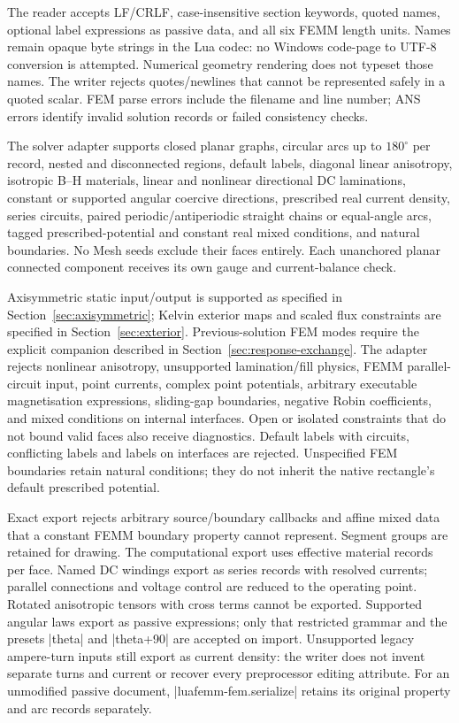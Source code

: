 The reader accepts LF/CRLF, case-insensitive section keywords, quoted names,
optional label expressions as passive data, and all six FEMM length units.
Names remain opaque byte strings in the Lua codec: no Windows code-page to UTF-8
conversion is attempted. Numerical geometry rendering does not typeset those
names. The writer rejects quotes/newlines that cannot be represented safely in a
quoted scalar. FEM parse errors include the filename and line number; ANS
errors identify invalid solution records or failed consistency checks.

The solver adapter supports closed planar graphs, circular arcs up to $180^\circ$
per record, nested and disconnected regions, default labels, diagonal linear
anisotropy, isotropic B--H materials, linear and nonlinear directional DC laminations, constant
or supported angular coercive directions, prescribed real current density,
series circuits, paired periodic/antiperiodic straight chains or equal-angle arcs,
tagged prescribed-potential and constant real mixed conditions, and natural
boundaries. No Mesh seeds exclude their faces entirely. Each
unanchored planar connected component receives its own gauge and current-balance check.

Axisymmetric static input/output is supported as specified in
Section~\ref{sec:axisymmetric}; Kelvin exterior maps and scaled flux constraints
are specified in Section~\ref{sec:exterior}. Previous-solution FEM modes require the explicit companion described in
Section~\ref{sec:response-exchange}. The adapter rejects nonlinear
anisotropy, unsupported lamination/fill physics, FEMM parallel-circuit input,
point currents, complex point potentials, arbitrary executable magnetisation
expressions, sliding-gap boundaries, negative
Robin coefficients, and mixed conditions on internal interfaces. Open or isolated
constraints that do not bound valid faces also receive diagnostics. Default labels
with circuits, conflicting labels and labels on interfaces are rejected.
Unspecified FEM boundaries retain natural conditions; they do not inherit the
native rectangle's default prescribed potential.

Exact export rejects arbitrary source/boundary callbacks and affine mixed data
that a constant FEMM boundary property cannot represent. Segment groups are
retained for drawing. The computational export uses effective material records
per face. Named DC windings export as series records with resolved currents;
parallel connections and voltage control are reduced to the operating point.
Rotated anisotropic tensors with cross terms cannot be exported. Supported
angular laws export as passive expressions; only that restricted grammar and
the presets |theta| and |theta+90| are accepted on import. Unsupported legacy
ampere-turn inputs still export as current density: the writer does not invent
separate turns and current or recover every preprocessor editing attribute. For an unmodified passive document,
|luafemm-fem.serialize| retains its original property and arc records separately.

